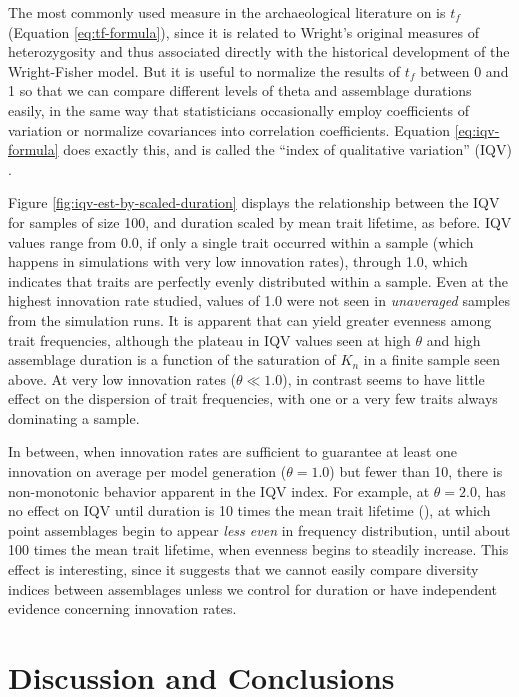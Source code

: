 The most commonly used measure in the archaeological literature on \ct is $t_f$ (Equation \ref{eq:tf-formula}), since it is related to Wright's original measures of heterozygosity and thus associated directly with the historical development of the Wright-Fisher model.  But it is useful to normalize the results of $t_f$ between 0 and 1 so that we can compare different levels of theta and assemblage durations easily, in the same way that statisticians occasionally employ coefficients of variation or normalize covariances into correlation coefficients.  Equation \ref{eq:iqv-formula} does exactly this, and is called the ``index of qualitative variation'' (IQV) \citep{wilcox1973indices}.

Figure \ref{fig:iqv-est-by-scaled-duration} displays the relationship between the IQV for samples of size 100, and \timeav duration scaled by mean trait lifetime, as before.  IQV values range from 0.0, if only a single trait occurred within a sample (which happens in simulations with very low innovation rates), through 1.0, which indicates that traits are perfectly evenly distributed within a sample.  Even at the highest innovation rate studied, values of 1.0 were not seen in \emph{unaveraged} samples from the simulation runs.  It is apparent that \timeav can yield greater evenness among trait frequencies, although the plateau in IQV values  seen at high $\theta$ and high assemblage duration is a function of the saturation of $K_n$ in a finite sample seen above.  At very low innovation rates ($\theta \ll 1.0$), \timeav in contrast seems to have little effect on the dispersion of trait frequencies, with one or a very few traits always dominating a sample.



In between, when innovation rates are sufficient to guarantee at least one innovation on average per model generation ($\theta = 1.0$) but fewer than 10, there is non-monotonic behavior apparent in the IQV index.  For example, at $\theta = 2.0$, \timeav has no effect on IQV until duration is 10 times the mean trait lifetime (\mtl), at which point assemblages begin to appear \emph{less even} in frequency distribution, until about 100 times the mean trait lifetime, when evenness begins to steadily increase.   This effect is interesting, since it suggests that we cannot easily compare diversity indices between assemblages unless we control for duration or have independent evidence concerning innovation rates.   
 

\section{Discussion and Conclusions}
\label{ta:sec:conclusions}

